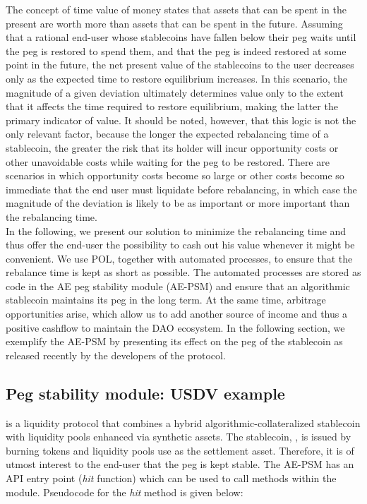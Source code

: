 The concept of time value of money states that assets that can be spent in the present are worth more than assets that can be spent in the future. 
Assuming that a rational end-user whose stablecoins have fallen below their peg waits until the peg is restored to spend them, and that the peg is indeed restored at some point in the future, the net present value of the stablecoins to the user decreases only as the expected time to restore equilibrium increases.
In this scenario, the magnitude of a given deviation ultimately determines value only to the extent that it affects the time required to restore equilibrium, making the latter the primary indicator of value. It should be noted, however, that this logic is not the only relevant factor, because the longer the expected rebalancing time of a stablecoin, the greater the risk that its holder will incur opportunity costs or other unavoidable costs while waiting for the peg to be restored.
There are scenarios in which opportunity costs become so large or other costs become so immediate that the end user must liquidate before rebalancing, in which case the magnitude of the deviation is likely to be as important or more important than the rebalancing time.\\[-1em]

In the following, we present our solution to minimize the rebalancing time and thus offer the end-user the possibility to cash out his value whenever it might be convenient.
We use POL, together with automated processes, to ensure that the rebalance time is kept as short as possible.
The automated processes are stored as code in the AE peg stability module (AE-PSM) and ensure that an algorithmic stablecoin maintains its peg in the long term.
At the same time, arbitrage opportunities arise, which allow us to add another source of income and thus a positive cashflow to maintain the DAO ecosystem.
In the following section, we exemplify the AE-PSM by presenting its effect on the peg of the \usdv stablecoin as released recently by the developers of the \vader protocol.

\subsection{Peg stability module: USDV example}
\label{subsec:peg_stability_module}
\vader is a liquidity protocol that combines a hybrid algorithmic-collateralized stablecoin with liquidity pools enhanced via synthetic assets.\cite{vader}
The stablecoin, \usdv, is issued by burning \vader tokens and liquidity pools use \usdv as the settlement asset.
Therefore, it is of utmost interest to the end-user that the \usdv peg is kept stable.
The AE-PSM has an API entry point (\textit{hit} function) which can be used to call methods within the module.
Pseudocode for the \textit{hit} method is given below:

